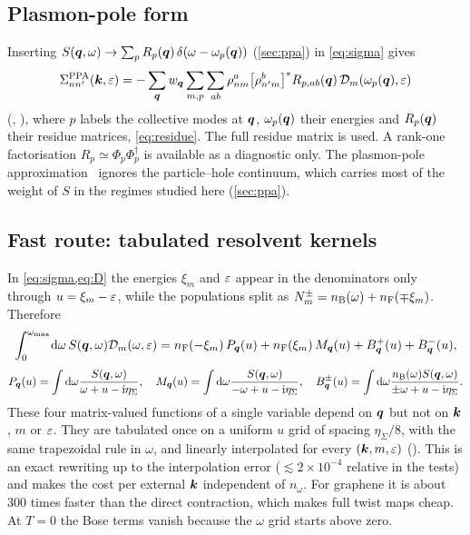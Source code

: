 \subsection{Plasmon-pole form}

Inserting $S(\bm q,\omega)\to\sum_pR_p(\bm q)\,\delta(\omega-\omega_p(\bm q))$ (\cref{sec:ppa}) in \cref{eq:sigma} gives
\begin{equation}
\Sigma^{\rm PPA}_{nn'}(\bm k,\varepsilon)=-\sum_{\bm q}w_{\bm q}\sum_{m,p}\sum_{ab}\rho^a_{nm}\bigl[\rho^b_{n'm}\bigr]^*R_{p,ab}(\bm q)\,
\mathcal D_m(\omega_p(\bm q),\varepsilon)
\end{equation}
(, ), where $p$ labels the collective modes at
$\bm q$, $\omega_p(\bm q)$ their energies and $R_p(\bm q)$ their residue matrices, \cref{eq:residue}. The full residue matrix is
used. A rank-one factorisation $R_p\simeq\Phi_p\Phi_p^\dagger$ is available as a diagnostic only. The plasmon-pole
approximation~\cite{HybertsenLouie1986,GodbyNeeds1989} ignores the particle--hole continuum, which carries most of the weight
of $S$ in the regimes studied here (\cref{sec:ppa}).

\subsection{Fast route: tabulated resolvent kernels}
\label{sec:kernel}

In \cref{eq:sigma,eq:D} the energies $\xi_m$ and $\varepsilon$ appear in the denominators only through $u=\xi_m-\varepsilon$, while the
populations split as $N^\pm_m=n_{\rm B}(\omega)+n_{\rm F}(\mp\xi_m)$. Therefore
\begin{equation}
\int_0^{\omega_{\max}}\!\mathrm d\omega\,S(\bm q,\omega)\mathcal D_m(\omega,\varepsilon)=n_{\rm F}(-\xi_m)\,P_{\bm q}(u)+n_{\rm F}(\xi_m)\,M_{\bm q}(u)+B^+_{\bm q}(u)+B^-_{\bm q}(u),
\label{eq:kernel}
\end{equation}
\begin{equation}
P_{\bm q}(u)=\int\mathrm d\omega\frac{S(\bm q,\omega)}{\omega+u-\mathrm i\eta_\Sigma},\quad
M_{\bm q}(u)=\int\mathrm d\omega\frac{S(\bm q,\omega)}{-\omega+u-\mathrm i\eta_\Sigma},\quad
B^\pm_{\bm q}(u)=\int\mathrm d\omega\frac{n_{\rm B}(\omega)S(\bm q,\omega)}{\pm\omega+u-\mathrm i\eta_\Sigma}.
\end{equation}
These four matrix-valued functions of a single variable depend on $\bm q$ but not on $\bm k$, $m$ or $\varepsilon$. They are tabulated
once on a uniform $u$ grid of spacing $\eta_\Sigma/8$, with the same trapezoidal rule in $\omega$, and linearly interpolated
for every $(\bm k,m,\varepsilon)$ (). This is an exact rewriting up to the interpolation error
($\lesssim2\times10^{-4}$ relative in the tests) and makes the cost per external $\bm k$ independent of $n_\omega$. For graphene
it is about 300 times faster than the direct contraction, which makes full twist maps cheap. At $T=0$ the Bose terms
vanish because the $\omega$ grid starts above zero.

